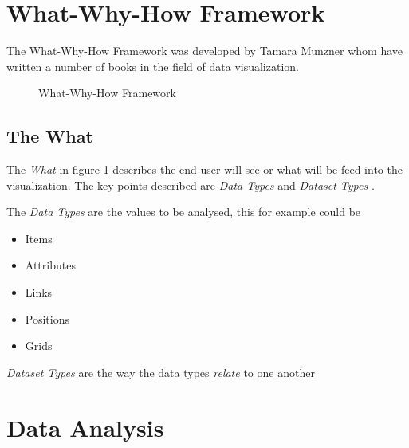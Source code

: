 \section{What-Why-How Framework} \label{sec:WhatWhyHow}

The What-Why-How Framework was developed by Tamara Munzner whom have written
a number of books in the field of data visualization. \cite{T2023VisualisationBookshelf} 

\begin{figure}[h]
    \centering
    \caption{What-Why-How Framework}
    \label{fig:WhatWhyHow}
\end{figure}

\subsection{The What}

The \textit{What} in figure \ref{fig:WhatWhyHow} describes the end user will 
see or what will be feed into the visualization. The key points described are
\textit{Data Types} and \textit{Dataset Types} \cite{Munzner2015VisualizationDesign}.

The \textit{Data Types} are the values to be analysed, this for example could be

\begin{itemize}
    \item Items
    \item Attributes
    \item Links
    \item Positions
    \item Grids
\end{itemize}

\textit{Dataset Types} are the way the data types \textit{relate} to 
one another

\section{Data Analysis}\label{sec:DataAndAnalytics}